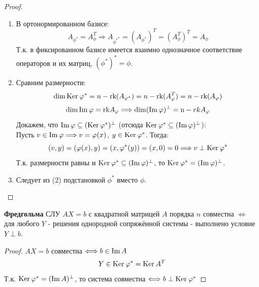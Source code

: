 \begin{proof} \tab
    \begin{enumerate}
        \item В ортонормированном базисе:
        $$A_{\phi^{*}} = A_{\phi}^T \Longrightarrow  A_{{\phi^{*}}^{*}} = (A_{\phi^{*}})^T = (A_{\phi}^T)^T = A_{\phi}$$
        Т.к. в фиксированном базисе имеется взаимно однозначное соответствие операторов и их матриц, $(\phi^{*})^{*} = \phi$.
        \item Сравним размерности:
        $$\dim \textup{Ker}\hspace{0.07cm}\phi^{*} = n - \textup{rk}(A_{\phi^{*}}) = n - \textup{rk}(A_{\phi}^T) = n - \textup{rk}(A_{\phi})$$
        $$\dim \textup{Im}\hspace{0.07cm}\phi = \textup{rk} A_{\phi} \Longrightarrow \dim (\textup{Im}\hspace{0.07cm}\phi)^{\perp} = \textup n - {rk} A_{\phi}$$
        Докажем, что $\textup{Im}\hspace{0.07cm}\phi \subseteq (\textup{Ker}\hspace{0.07cm}\phi^{*})^{\perp}$  (отсюда $\textup{Ker}\hspace{0.07cm}\phi^{*} \subseteq (\textup{Im}\hspace{0.07cm}\phi)^{\perp}$):\\
        Пусть $v \in \textup{Im}\hspace{0.07cm}\phi \Longrightarrow v = \phi(x)$, $y \in \textup{Ker}\hspace{0.07cm}\phi^{*}$. Тогда:
        $$(v, y) = (\phi(x), y) = (x, \phi^{*}(y)) = (x, 0) = 0 \Longrightarrow v \perp \textup{Ker}\hspace{0.07cm}\phi^{*}$$
        Т.к. размерности равны и $\textup{Ker}\hspace{0.07cm}\phi^{*} \subseteq (\textup{Im}\hspace{0.07cm}\phi)^{\perp}$, то $\textup{Ker}\hspace{0.07cm}\phi^{*} = (\textup{Im}\hspace{0.07cm}\phi)^{\perp}$.
        \item Следует из (2) подстановкой $\phi^{*}$ вместо $\phi$.
    \end{enumerate}
\end{proof}
\begin{theorem}\textbf{Фредгольма}
    СЛУ $AX = b$ с квадратной матрицей $A$ порядка $n$ совместна $\Longleftrightarrow $ для любого $Y$ - решения однородной сопряжённой системы - выполнено условие $Y \perp b$. 
\end{theorem}
\begin{proof}
    $AX = b$ совместна $\Longleftrightarrow  b \in \textup{Im}\hspace{0.07cm}A$
    $$Y \in \textup{Ker}\hspace{0.07cm}\phi^{*} = \textup{Ker}\hspace{0.07cm}A^T$$
    Т.к. $\textup{Ker}\hspace{0.07cm}\phi^{*} = (\textup{Im}\hspace{0.07cm}A)^\perp$, то система совместна $\Longleftrightarrow  b \perp \textup{Ker}\hspace{0.07cm}\phi^{*}$  
\end{proof}
